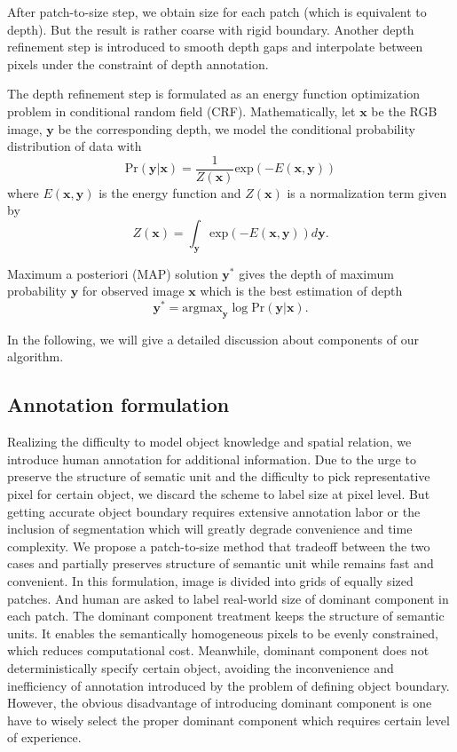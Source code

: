 \documentclass[10pt,twocolumn,letterpaper]{article}
\begin{document}
After patch-to-size step, we obtain size for each patch (which is equivalent to depth). But the result is rather coarse with rigid boundary. Another depth refinement step is introduced to smooth depth gaps and interpolate between pixels under the constraint of depth annotation.

The depth refinement step is formulated as an energy function optimization problem in conditional random field (CRF). Mathematically, let $\mathbf{x}$ be the RGB image, $\mathbf{y}$ be the corresponding depth, we model the conditional probability distribution of data with
\begin{equation}
\text{Pr}(\mathbf{y}|\mathbf{x}) = \frac{1}{Z(\mathbf{x})}\text{exp}(-E(\mathbf{x}, \mathbf{y}))
\end{equation}
where $E(\mathbf{x}, \mathbf{y})$ is the energy function and $Z(\mathbf{x})$ is a normalization term given by
\begin{equation}
Z(\mathbf{x}) = \int_{\mathbf{y}}\text{exp}(-E(\mathbf{x}, \mathbf{y})) d\mathbf{y}.
\end{equation}

Maximum a posteriori (MAP) solution $\mathbf{y}^*$ gives the depth of maximum probability $\mathbf{y}$ for observed image $\mathbf{x}$ which is the best estimation of depth
\begin{equation}
\mathbf{y^*} = \text{argmax}_{\mathbf{y}} \log \text{Pr}(\mathbf{y}|\mathbf{x}).
\end{equation}
\par
In the following, we will give a detailed discussion about components of our algorithm.
\subsection{Annotation formulation}
Realizing the difficulty to model object knowledge and spatial relation, we introduce human annotation for additional information. Due to the urge to preserve the structure of sematic unit and the difficulty to pick representative pixel for certain object, we discard the scheme to label size at pixel level. But getting accurate object boundary requires extensive annotation labor or the inclusion of segmentation which will greatly degrade convenience and time complexity. We propose a patch-to-size method that tradeoff between the two cases and partially preserves structure of semantic unit while remains fast and convenient. In this formulation, image is divided into grids of equally sized patches. And human are asked to label real-world size of dominant component in each patch. The dominant component treatment keeps the structure of semantic units. It enables the semantically homogeneous pixels to be evenly constrained, which reduces computational cost. Meanwhile, dominant component does not deterministically specify certain object, avoiding the inconvenience and inefficiency of annotation introduced by the problem of defining object boundary. However, the obvious disadvantage of introducing dominant component is one have to wisely select the proper dominant component which requires certain level of experience.
\end{document}
